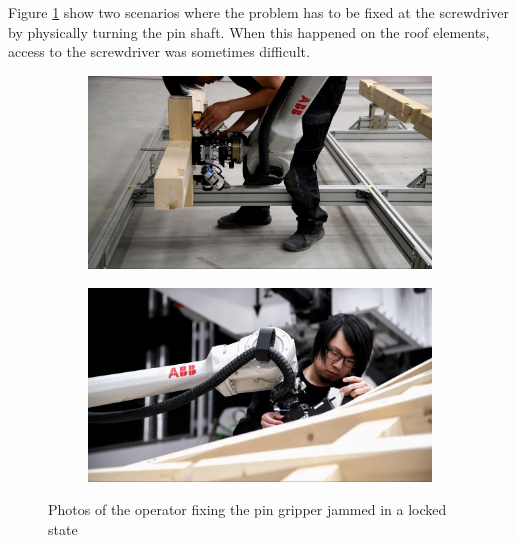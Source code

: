 Figure \ref{fig:fixing-pin-gripper-jammed-in-locked-state} show two scenarios where the problem has to be fixed at the screwdriver by physically turning the pin shaft. When this happened on the roof elements, access to the screwdriver was sometimes difficult.

\begin{figure}[!h]
    \centering
    \begin{subfigure}[b]{0.49\textwidth}
        \centering
        \includegraphics[width=\textwidth]{images/7b/img91.jpg}
    \end{subfigure}
    \hfill
    \begin{subfigure}[b]{0.49\textwidth}
        \centering
        \includegraphics[width=\textwidth]{images/7b/img92.jpg}
    \end{subfigure}
    \caption{Photos of the operator fixing the pin gripper jammed in a locked state}
    \label{fig:fixing-pin-gripper-jammed-in-locked-state}
\end{figure}



